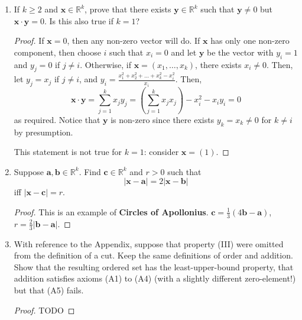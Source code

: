 \documentclass{scrbook}
\newcommand{\R}{\mathbb{R}}
\begin{document}
\begin{enumerate}
\begin{proof}
The interpretation of this is that in a parallelogram, the sums of the squares of the lengths of the diagonals is equal to the sum of the squares of the lengths of the four sides.
\end{proof}

\item If $k \ge 2$ and $\textbf{x} \in \R^k$, prove that there exists $\textbf{y} \in \R^k$ such that $\textbf{y} \ne 0$ but $\textbf{x} \cdot \textbf{y} = 0$. Is this also true if $k = 1$?

\begin{proof}
If $\textbf{x} = 0$, then any non-zero vector will do. If $\textbf{x}$ has only one non-zero component, then choose $i$ such that $x_i = 0$ and let $\textbf{y}$ be the vector with $y_i = 1$ and $y_j = 0$ if $j \ne i$. Otherwise, if $\textbf{x} = (x_1, \dotsc, x_k)$, there exists $x_i \ne 0$. Then, let $y_j = x_j$ if $j \ne i$, and $y_i = \frac{x_1^2 + x_2^2 + \dotsc + x_k^2 - x_i^2}{x_i}$. Then, 
\[
	\textbf{x} \cdot \textbf{y} = \sum_{j=1}^{k} x_j y_j = \left(\sum_{j=1}^{k} x_j x_j\right) - x_i^2 - x_iy_i = 0
\]
as required. Notice that $\textbf{y}$ is non-zero since there exists $y_k = x_k \ne 0$ for $k \ne i$ by presumption.

This statement is not true for $k = 1$: consider $\textbf{x} = (1)$.
\end{proof}

\item Suppose $\textbf{a}, \textbf{b} \in \R^k$. Find $\textbf{c} \in \R^k$ and $r > 0$ such that
\[
	|\textbf{x} - \textbf{a}| = 2 |\textbf{x} - \textbf{b}|
\]
iff $|\textbf{x} - \textbf{c}| = r$.

\begin{proof}
This is an example of \textbf{Circles of Apollonius}. $\textbf{c} = \frac{1}{3} \left(4\textbf{b} - \textbf{a}\right)$, $r = \frac{2}{3} |\textbf{b} - \textbf{a}|$. 
\end{proof}

\item With reference to the Appendix, suppose that property (III) were omitted from the definition of a cut. Keep the same definitions of order and addition. Show that the resulting ordered set has the least-upper-bound property, that addition satisfies axioms (A1) to (A4) (with a slightly different zero-element!) but that (A5) fails.

\begin{proof}
TODO
\end{proof}
\end{enumerate}
\end{document}
